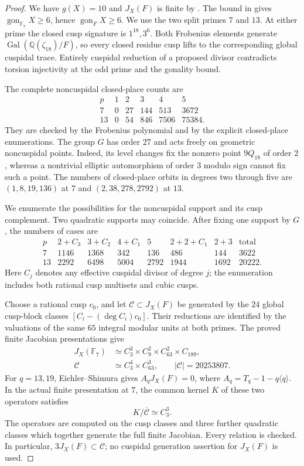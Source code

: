 \begin{proof}
We have $g(X)=10$ and $J_X(F)$ is finite by
\cite[Theorem~4.1]{DS}. The bound in \cite[Table~1]{NV} gives
$\operatorname{gon}_{\mathbb F_7}X\geq6$, hence
$\operatorname{gon}_F X\geq6$.
We use the two split primes $7$ and $13$.
At either prime the closed cusp signature is $1^{18},3^6$.
Both Frobenius elements generate
$\operatorname{Gal}(\mathbb Q(\zeta_{18})/F)$, so every closed
residue cusp lifts to the corresponding global cuspidal trace.
Entirely cuspidal reduction of a proposed divisor contradicts
torsion injectivity at the odd prime and the gonality bound.

The complete noncuspidal closed-place counts are
\[
\begin{array}{c|rrrrr}
 p&1&2&3&4&5\\ \hline
 7&0&27&144&513&3672\\
 13&0&54&846&7506&75384.
\end{array}
\]
They are checked by the Frobenius polynomial and by the explicit
closed-place enumerations. The group $G$ has order $27$ and acts
freely on geometric noncuspidal points. Indeed, its level changes
fix the nonzero point $9Q_{18}$ of order $2$, whereas a nontrivial
elliptic automorphism of order $3$ modulo sign cannot fix such a point.
The numbers of closed-place orbits in degrees two through five are
$(1,8,19,136)$ at $7$ and $(2,38,278,2792)$ at $13$.

We enumerate the possibilities for the noncuspidal support and
its cusp complement. Two quadratic supports may coincide.
After fixing one support by $G$, the numbers of cases are
\[
\begin{array}{c|rrrrrr|r}
 p&2+C_3&3+C_2&4+C_1&5&2+2+C_1&2+3&\text{total}\\ \hline
 7&1146&1368&342&136&486&144&3622\\
 13&2292&6498&5004&2792&1944&1692&20222.
\end{array}
\]
Here $C_j$ denotes any effective cuspidal divisor of degree $j$;
the enumeration includes both rational cusp multisets and cubic cusps.

Choose a rational cusp $c_0$, and let $\mathcal C\subset J_X(F)$
be generated by the $24$ global cusp-block classes
$[C_i-(\deg C_i)c_0]$.
Their reductions are identified by the valuations of the same
$65$ integral modular units at both primes.
The proved finite Jacobian presentations give
\[
\begin{split}
 J_X(\mathbb F_7)&\simeq C_3^3\times C_9^2\times C_{63}^2\times C_{189},\\
 \mathcal C&\simeq C_3^4\times C_{63}^3,
             \qquad |\mathcal C|=20253807.
\end{split}
\]
For $q=13,19$, Eichler--Shimura gives
$A_qJ_X(F)=0$, where $A_q=T_q-1-q\langle q\rangle$.
In the actual finite presentation at $7$, the common kernel $K$
of these two operators satisfies
\[
                       K/\overline{\mathcal C}\simeq C_3^3.
\]
The operators are computed on the cusp classes and three further
quadratic classes which together generate the full finite Jacobian.
Every relation is checked. In particular,
$3J_X(F)\subset\mathcal C$; no cuspidal generation assertion
for $J_X(F)$ is used.


\end{proof}
